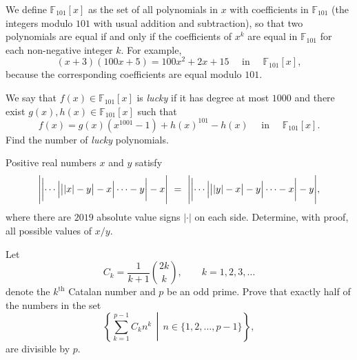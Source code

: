 \documentclass[11pt]{article}
\theoremstyle{definition}
\begin{document}
\begin{question}[name={2020 HMMT, Algebra \& Number Theory, \href{https://artofproblemsolving.com/community/c4p14065090}{Problem 10}}]
	We define $\mathbb F_{101}[x]$ as the set of all polynomials in $x$ with coefficients in $\mathbb F_{101}$ (the integers modulo $101$ with usual addition and subtraction), so that two polynomials are equal if and only if the coefficients of $x^k$ are equal in $\mathbb F_{101}$ for each non-negative integer $k$. For example, $$(x+3)(100x+5)=100x^2+2x+15 \quad \text{ in } \quad \mathbb F_{101}[x],$$ because the corresponding coefficients are equal modulo $101$.
	
	We say that $f(x)\in\mathbb F_{101}[x]$ is \textit{lucky} if it has degree at most $1000$ and there exist $g(x),h(x)\in\mathbb F_{101}[x]$ such that\[f(x)=g(x)(x^{1001}-1)+h(x)^{101}-h(x) \quad \text{ in } \quad \mathbb F_{101}[x].\] Find the number of \textit{lucky} polynomials.
\end{question}



\begin{question}[name={2020 HMMT, Team, \href{https://artofproblemsolving.com/community/c4p14065378}{Problem 7}}]
	Positive real numbers $x$ and $y$ satisfy
	$$\Biggl|\biggl|\cdots\Bigl|\bigl||x|-y\bigr|-x\Bigr|\cdots -y\biggr|-x\Biggr|\ =\ \Biggl|\biggl|\cdots\Bigl|\bigl||y|-x\bigr|-y\Bigr|\cdots -x\biggr|-y\Biggr|,$$where there are $2019$ absolute value signs $|\cdot|$ on each side. Determine, with proof, all possible values of ${x}/{y}$.
\end{question}



%	




\begin{question}[name={2020 HMIC, \href{https://artofproblemsolving.com/community/c6h2052366p14590872}{Problem 4}}]
	Let $$C_k=\frac{1}{k+1}\binom{2k}{k}, \qquad k=1,2,3,\dots$$ denote the $k^{\text{th}}$ Catalan number and $p$ be an odd prime. Prove that exactly half of the numbers in the set
	\[\left\{\sum_{k=1}^{p-1}C_kn^k\,\middle\vert\, n\in\{1,2,\ldots,p-1\}\right\},\]are divisible by $p$.
\end{question}



%	
\end{document}
